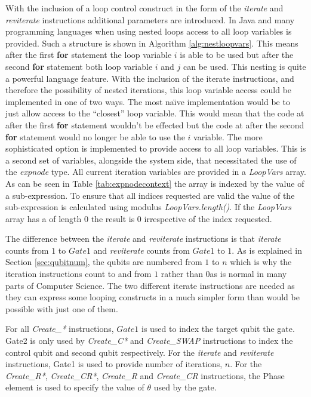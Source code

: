 With the inclusion of a loop control construct in the form of the \emph{iterate} and \emph{reviterate} instructions additional parameters are introduced.
In Java and many programming languages when using nested loops access to all loop variables is provided.
Such a structure is shown in Algorithm \ref{alg:nestloopvars}.
This means after the first \textbf{for} statement the loop variable $i$ is able to be used but after the second \textbf{for} statement both loop variable $i$ and $j$ can be used.
This nesting is quite a powerful language feature.
With the inclusion of the iterate instructions, and therefore the possibility of nested iterations, this loop variable access could be implemented in one of two ways.
The most na\"{\i}ve implementation would be to just allow access to the ``closest'' loop variable.
This would mean that the code at after the first \textbf{for} statement wouldn't be effected but the code at after the second \textbf{for} statement would no longer be able to use the $i$ variable.
The more sophisticated option is implemented to provide access to all loop variables.
This is a second set of variables, alongside the system side, that necessitated the use of the \emph{expnode} type.
All current iteration variables are provided in a \emph{LoopVars} array.
As can be seen in Table \ref{tab:expnodecontext} the array is indexed by the value of a sub-expression.
To ensure that all indices requested are valid the value of the sub-expression is calculated using modulus \emph{LoopVars.length()}.
If the \emph{LoopVars} array has a of length $0$ the result is $0$ irrespective of the index requested.

The difference between the \emph{iterate} and \emph{reviterate} instructions is that \emph{iterate} counts from $1$ to $Gate1$ and \emph{reviterate} counts from $Gate1$ to $1$.
As is explained in Section \ref{sec:qubitnum}, the qubits are numbered from $1$ to $n$ which is why the iteration instructions count to and from $1$ rather than $0$as is normal in many parts of Computer Science.
The two different iterate instructions are needed as they can express some looping constructs in a much simpler form than would be possible with just one of them.

For all \emph{Create\_*} instructions, $Gate1$ is used to index the target qubit the gate.
Gate2 is only used by \emph{Create\_C*} and \emph{Create\_SWAP} instructions to index the control qubit and second qubit respectively.
For the \emph{iterate} and \emph{reviterate} instructions, Gate1 is used to provide number of iterations, $n$.
For the \emph{Create\_R*}, \emph{Create\_CR*}, \emph{Create\_R} and  \emph{Create\_CR} instructions, the Phase element is used to specify the value of $\theta$ used by the gate.

